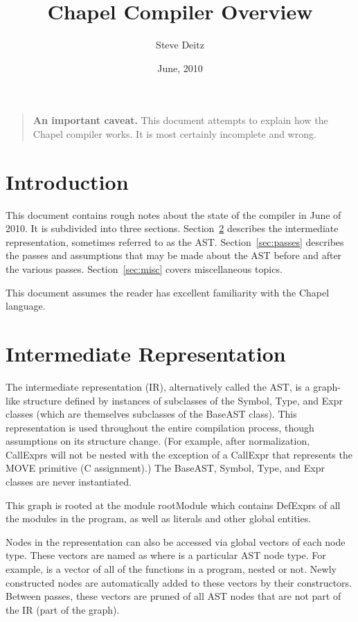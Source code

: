 \documentclass[10pt]{article}
\title{Chapel Compiler Overview}
\author{Steve Deitz}
\date{June, 2010}
\begin{document}
\maketitle

\begin{quote}
\footnotesize
{\bf An important caveat.}  This document attempts to explain how the
Chapel compiler works.  It is most certainly incomplete and wrong.
\end{quote}

{
  \footnotesize
  \tableofcontents
}

\section{Introduction}

This document contains rough notes about the state of the compiler in
June of 2010.  It is subdivided into three sections.
Section~\ref{sec:ast} describes the intermediate representation,
sometimes referred to as the AST.  Section~\ref{sec:passes} describes
the passes and assumptions that may be made about the AST before and
after the various passes.  Section~\ref{sec:misc} covers miscellaneous
topics.

This document assumes the reader has excellent familiarity with the
Chapel language.

\section{Intermediate Representation}
\label{sec:ast}

The intermediate representation (IR), alternatively called the AST, is
a graph-like structure defined by instances of subclasses of the
Symbol, Type, and Expr classes (which are themselves subclasses of the
BaseAST class).  This representation is used throughout the entire
compilation process, though assumptions on its structure change.  (For
example, after normalization, CallExprs will not be nested with the
exception of a CallExpr that represents the MOVE primitive (C
assignment).)  The BaseAST, Symbol, Type, and Expr classes are never
instantiated.

This graph is rooted at the module rootModule which contains DefExprs
of all the modules in the program, as well as literals and other
global entities.

Nodes in the representation can also be accessed via global vectors of
each node type.  These vectors are named as  where 
is a particular AST node type.  For example,  is a
vector of all of the functions in a program, nested or not.  Newly
constructed nodes are automatically added to these vectors by their
constructors.  Between passes, these vectors are pruned of all AST
nodes that are not part of the IR (part of the graph).
\end{document}
